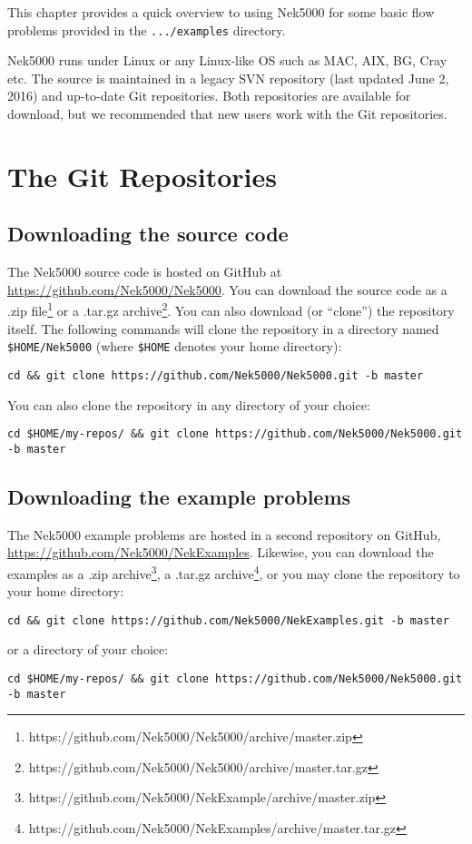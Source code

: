This chapter provides a quick overview to using Nek5000
for some basic flow problems provided in the {\tt .../examples}
directory.
           
Nek5000 runs under Linux or any Linux-like OS such as MAC, AIX, BG, Cray etc.
The source is maintained in a legacy SVN repository (last updated June 2, 2016)
and up-to-date Git repositories.  Both repositories are available for
download, but we recommended that new users work with the Git repositories.  

\section{The Git Repositories}

\subsection{Downloading the source code}
The Nek5000 source code is hosted on GitHub at \url{https://github.com/Nek5000/Nek5000}.  You can download the source code as a .zip file\footnote{https://github.com/Nek5000/Nek5000/archive/master.zip} or a .tar.gz archive\footnote{https://github.com/Nek5000/Nek5000/archive/master.tar.gz}.  You can also download (or ``clone'') the repository itself.  The following commands will clone the repository in a directory named {\tt \$HOME/Nek5000} (where {\tt \$HOME} denotes your home directory):
\begin{verbatim}
cd && git clone https://github.com/Nek5000/Nek5000.git -b master
\end{verbatim}
You can also clone the repository in any directory of your choice:
\begin{verbatim}
cd $HOME/my-repos/ && git clone https://github.com/Nek5000/Nek5000.git -b master
\end{verbatim}

\subsection{Downloading the example problems}
The Nek5000 example problems are hosted in a second repository on GitHub, \url{https://github.com/Nek5000/NekExamples}.  Likewise, you can download the examples as a .zip archive\footnote{https://github.com/Nek5000/NekExample/archive/master.zip}, a .tar.gz archive\footnote{https://github.com/Nek5000/NekExamples/archive/master.tar.gz}, or you may clone the repository to your home directory:
\begin{verbatim}
cd && git clone https://github.com/Nek5000/NekExamples.git -b master
\end{verbatim}
or a directory of your choice:
\begin{verbatim}
cd $HOME/my-repos/ && git clone https://github.com/Nek5000/Nek5000.git -b master
\end{verbatim}

